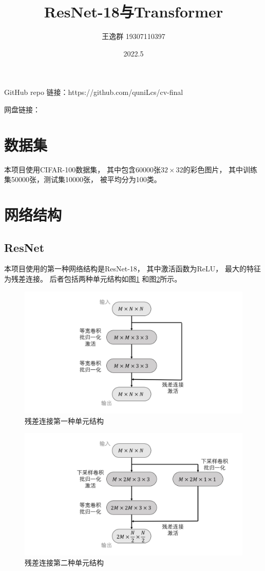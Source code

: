 \documentclass[12pt]{article}
\title{ResNet-18与Transformer}
\author{王逸群 19307110397}
\date{2022.5}
\begin{document}
	
\maketitle

GitHub repo 链接：https://github.com/quniLcs/cv-final

网盘链接：

\section{数据集}

本项目使用CIFAR-100数据集，
其中包含60000张$32\times32$的彩色图片，
其中训练集50000张，测试集10000张，
被平均分为100类。

\section{网络结构}

\subsection{ResNet}

本项目使用的第一种网络结构是ResNet-18，
其中激活函数为ReLU，
最大的特征为残差连接。
后者包括两种单元结构如图\ref{fig:ResNetI}
和图\ref{fig:ResNetII}所示。

\begin{figure}[p]
	\includegraphics[width=\linewidth]{graph/ResNetI.jpg}
	\caption{残差连接第一种单元结构}
	\label{fig:ResNetI}
\end{figure}

\begin{figure}[p]
	\includegraphics[width=\linewidth]{graph/ResNetII.jpg}
	\caption{残差连接第二种单元结构}
	\label{fig:ResNetII}
\end{figure}
\end{document}
